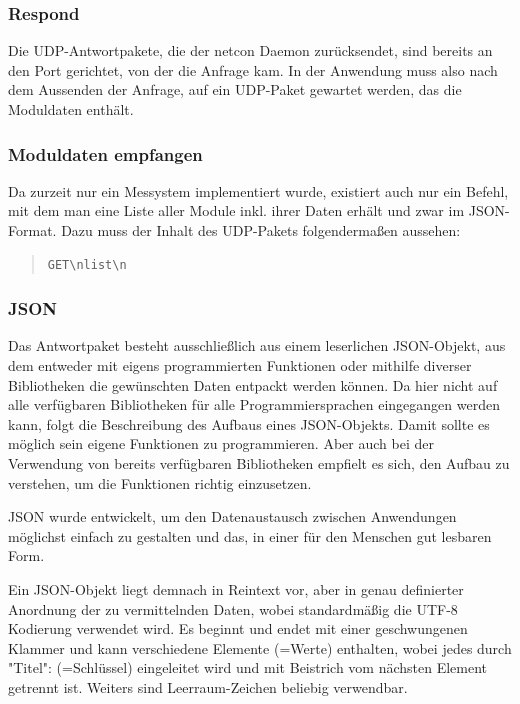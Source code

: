 \documentclass[a4paper,14pt,headsepline]{scrartcl}
\begin{document}
\newpage

\subsubsection*{Respond}
Die UDP-Antwortpakete, die der netcon Daemon zurücksendet, sind bereits an den Port gerichtet, von der die Anfrage kam. In der Anwendung muss also nach dem Aussenden der Anfrage, auf ein UDP-Paket gewartet werden, das die Moduldaten enthält.

\subsubsection*{Moduldaten empfangen}

Da zurzeit nur ein Messystem implementiert wurde, existiert auch nur ein Befehl, mit dem man eine Liste aller Module inkl. ihrer Daten erhält und zwar im JSON-Format. Dazu muss der Inhalt des UDP-Pakets folgendermaßen aussehen:

\begin{quote}
\begin{verbatim}
GET\nlist\n
\end{verbatim}
\end{quote} 

\subsubsection*{JSON}

Das Antwortpaket besteht ausschließlich aus einem leserlichen JSON-Objekt, aus dem entweder mit eigens programmierten Funktionen oder mithilfe diverser Bibliotheken die gewünschten Daten entpackt werden können. Da hier nicht auf alle verfügbaren Bibliotheken für alle Programmiersprachen eingegangen werden kann, folgt die Beschreibung des Aufbaus eines JSON-Objekts. Damit sollte es möglich sein eigene Funktionen zu programmieren. Aber auch bei der Verwendung von bereits verfügbaren Bibliotheken empfielt es sich, den Aufbau zu verstehen, um die Funktionen richtig einzusetzen. 

\newpage

JSON wurde entwickelt, um den Datenaustausch zwischen Anwendungen \linebreak möglichst einfach zu gestalten und das, in einer für den Menschen gut lesbaren Form. 

Ein JSON-Objekt liegt demnach in Reintext vor, aber in genau definierter Anordnung der zu vermittelnden Daten, wobei standardmäßig die UTF-8 Kodierung verwendet wird. Es beginnt und endet mit einer geschwungenen Klammer und kann verschiedene Elemente (=Werte) enthalten, wobei jedes durch "Titel": (=Schlüssel) eingeleitet wird und mit Beistrich vom nächsten Element getrennt ist. Weiters sind Leerraum-Zeichen beliebig verwendbar.
\end{document}

